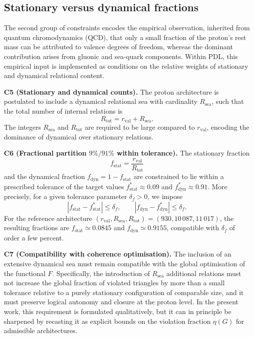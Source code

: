 \documentclass[11pt,a4paper]{article}
\begin{document}
\subsection{Stationary versus dynamical fractions}

The second group of constraints encodes the empirical observation, inherited from quantum chromodynamics (QCD), that only a small fraction of the proton’s rest mass can be attributed to valence degrees of freedom, whereas the dominant contribution arises from gluonic and sea-quark components.\cite{AmslerQCDProton} Within PDL, this empirical input is implemented as conditions on the relative weights of stationary and dynamical relational content.

\medskip
\noindent\textbf{C5 (Stationary and dynamical counts).} The proton architecture is postulated to include a dynamical relational sea with cardinality $R_{\mathrm{sea}}$, such that the total number of internal relations is
\begin{equation}
R_{\mathrm{tot}} = r_{\mathrm{val}} + R_{\mathrm{sea}}.
\end{equation}
The integers $R_{\mathrm{sea}}$ and $R_{\mathrm{tot}}$ are required to be large compared to $r_{\mathrm{val}}$, encoding the dominance of dynamical over stationary relations.

\medskip
\noindent\textbf{C6 (Fractional partition $9\%/91\%$ within tolerance).} The stationary fraction
\begin{equation}
f_{\mathrm{stat}} = \frac{r_{\mathrm{val}}}{R_{\mathrm{tot}}}
\end{equation}
and the dynamical fraction $f_{\mathrm{dyn}} = 1 - f_{\mathrm{stat}}$ are constrained to lie within a prescribed tolerance of the target values $f_{\mathrm{stat}}^{\ast}\approx 0.09$ and $f_{\mathrm{dyn}}^{\ast}\approx 0.91$. More precisely, for a given tolerance parameter $\delta_f>0$, we impose
\begin{equation}
|f_{\mathrm{stat}} - f_{\mathrm{stat}}^{\ast}| \leq \delta_f,\qquad |f_{\mathrm{dyn}} - f_{\mathrm{dyn}}^{\ast}| \leq \delta_f.
\end{equation}
For the reference architecture $(r_{\mathrm{val}},R_{\mathrm{sea}},R_{\mathrm{tot}})=(930,10\,087,11\,017)$, the resulting fractions are $f_{\mathrm{stat}}\simeq 0.0845$ and $f_{\mathrm{dyn}}\simeq 0.9155$, compatible with $\delta_f$ of order a few percent.\cite{LaubscherPDLFull2026,LaubscherIMRadPDL2026}

\medskip
\noindent\textbf{C7 (Compatibility with coherence optimisation).} The inclusion of an extensive dynamical sea must remain compatible with the global optimisation of the functional $F$. Specifically, the introduction of $R_{\mathrm{sea}}$ additional relations must not increase the global fraction of violated triangles by more than a small tolerance relative to a purely stationary configuration of comparable size, and it must preserve logical autonomy and closure at the proton level.\cite{LaubscherPDLFull2026,LaubscherLDP2026} In the present work, this requirement is formulated qualitatively, but it can in principle be sharpened by recasting it as explicit bounds on the violation fraction $\eta(G)$ for admissible architectures.
\end{document}
